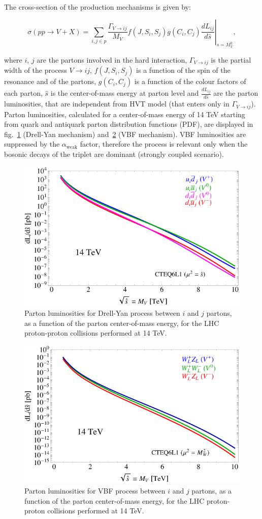 \noindent The cross-section of the production mechanisms is given by:

\begin{equation}
\sigma (pp \rightarrow V + X) = \left. \sum_{i, j \in p} \frac{\Gamma_{V \rightarrow ij}}{M_V} f(J, S_i, S_j) g(C_i, C_j) \frac{dL_{ij}}{d\hat{s}} \right|_{\hat{s} = M_V^2},
\label{eq:prod_xsec}
\end{equation}

\noindent where $i$, $j$ are the partons involved in the hard interaction, $\Gamma_{V \rightarrow ij}$ is the partial width of the process $V \rightarrow ij$, $f(J, S_i, S_j)$ is a function of the spin of the resonance and of the partons, $g(C_i, C_j)$ is a function of the colour factors of each parton, $\hat{s}$ is the center-of-mass energy at parton level and $\frac{dL_{ij}}{d \hat{s}}$ are the parton luminosities, that are independent from HVT model (that enters only in $\Gamma_{V \rightarrow ij}$).
\\
Parton luminosities, calculated for a center-of-mass energy of 14 TeV starting from quark and antiquark parton distribution functions (PDF), are displayed in fig.~\ref{fig:HVT_DY_partolumi} (Drell-Yan mechanism) and~\ref{fig:HVT_VBF_partolumi} (VBF mechanism). VBF luminosities are suppressed by the $\alpha_{\text{weak}}$ factor, therefore the process is relevant only when the bosonic decays of the triplet are dominant (strongly coupled scenario). 
\begin{figure}[!htb]
  \centering
    \includegraphics[width=.495\textwidth]{figures/Figures_LumiDY14.png}
  \caption{Parton luminosities for Drell-Yan process between $i$ and $j$ partons, as a function of the parton center-of-mass energy, for the LHC proton-proton collisions performed at 14 TeV.}
  \label{fig:HVT_DY_partolumi}
\end{figure}

\begin{figure}[!htb]
  \centering
    \includegraphics[width=.495\textwidth]{figures/Figures_LumiVBF14.png}
  \caption{Parton luminosities for VBF process between $i$ and $j$ partons, as a function of the parton center-of-mass energy, for the LHC proton-proton collisions performed at 14 TeV.}
  \label{fig:HVT_VBF_partolumi}
\end{figure}

